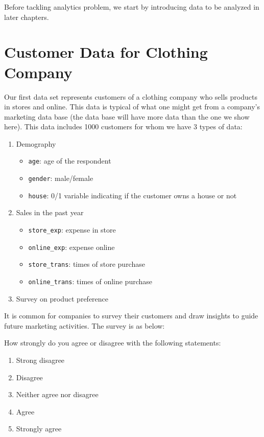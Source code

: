 \documentclass[12pt,]{krantz}
\providecommand{\tightlist}{%
  \setlength{\itemsep}{0pt}\setlength{\parskip}{0pt}}
\theoremstyle{definition}
\theoremstyle{definition}
\theoremstyle{definition}
\theoremstyle{remark}
\begin{document}
Before tackling analytics problem, we start by introducing data to be
analyzed in later chapters.

\section{Customer Data for Clothing
Company}\label{customer-data-for-clothing-company}

Our first data set represents customers of a clothing company who sells
products in stores and online. This data is typical of what one might
get from a company's marketing data base (the data base will have more
data than the one we show here). This data includes 1000 customers for
whom we have 3 types of data:

\begin{enumerate}
\def\labelenumi{\arabic{enumi}.}
\tightlist
\item
  Demography

  \begin{itemize}
  \tightlist
  \item
    \texttt{age}: age of the respondent
  \item
    \texttt{gender}: male/female
  \item
    \texttt{house}: 0/1 variable indicating if the customer owns a house
    or not
  \end{itemize}
\item
  Sales in the past year

  \begin{itemize}
  \tightlist
  \item
    \texttt{store\_exp}: expense in store
  \item
    \texttt{online\_exp}: expense online
  \item
    \texttt{store\_trans}: times of store purchase
  \item
    \texttt{online\_trans}: times of online purchase
  \end{itemize}
\item
  Survey on product preference
\end{enumerate}

It is common for companies to survey their customers and draw insights
to guide future marketing activities. The survey is as below:

How strongly do you agree or disagree with the following statements:

\begin{enumerate}
\def\labelenumi{\arabic{enumi}.}
\tightlist
\item
  Strong disagree
\item
  Disagree
\item
  Neither agree nor disagree
\item
  Agree
\item
  Strongly agree
\end{enumerate}
\end{document}
